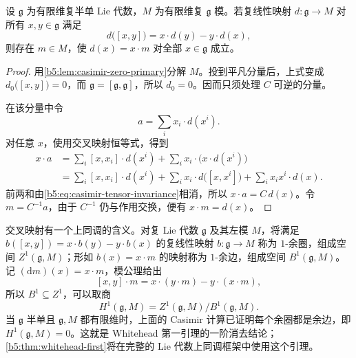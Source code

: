 \begin{lemma}[交叉映射的消去]\label{b5:lem:semisimple-crossed-map}
	设 \(\mathfrak g\) 为有限维复半单 Lie 代数，\(M\) 为有限维复 \(\mathfrak g\) 模。若复线性映射 \(d:\mathfrak g\to M\) 对所有 \(x,y\in\mathfrak g\) 满足
	\[
		d\bigl([x,y]\bigr)=x\cdot d(y)-y\cdot d(x),
	\]
	则存在 \(m\in M\)，使 \(d(x)=x\cdot m\) 对全部 \(x\in\mathfrak g\) 成立。
\end{lemma}
\begin{proof}
	用\cref{b5:lem:casimir-zero-primary}分解 \(M\)。投到平凡分量后，上式变成 \(d_0\bigl([x,y]\bigr)=0\)，而 \(\mathfrak g=[\mathfrak g,\mathfrak g]\)，所以 \(d_0=0\)。因而只须处理 \(C\) 可逆的分量。

	在该分量中令
	\[
		a=\sum_i x_i\cdot d(x^i).
	\]
	对任意 \(x\)，使用交叉映射恒等式，得到
	\begin{align*}
		x\cdot a &=\sum_i[x,x_i]\cdot d(x^i) +\sum_i x_i\cdot\bigl(x\cdot d(x^i)\bigr)\\
		&=\sum_i[x,x_i]\cdot d(x^i) +\sum_i x_i\cdot d\bigl([x,x^i]\bigr) +\sum_i x_i x^i\cdot d(x).
	\end{align*}
	前两和由\eqref{b5:eq:casimir-tensor-invariance}相消，所以 \(x\cdot a=C\,d(x)\)。令 \(m=C^{-1}a\)，由于 \(C^{-1}\) 仍与作用交换，便有 \(x\cdot m=d(x)\)。
\end{proof}

交叉映射有一个上同调的含义。对复 Lie 代数 \(\mathfrak g\) 及其左模 \(M\)，将满足 \(b([x,y])=x\cdot b(y)-y\cdot b(x)\) 的复线性映射 \(b:\mathfrak g\rightarrow M\) 称为 \(1\)-余圈，组成空间 \(Z^1(\mathfrak g,M)\)；形如 \(b(x)=x\cdot m\) 的映射称为 \(1\)-余边，组成空间 \(B^1(\mathfrak g,M)\)。记 \((\mathrm{d}m)(x)=x\cdot m\)，模公理给出
\[
	[x,y]\cdot m=x\cdot(y\cdot m)-y\cdot(x\cdot m),
\]
所以 \(B^1\subseteq Z^1\)，可以取商
\[
	H^1(\mathfrak g,M)=Z^1(\mathfrak g,M)/B^1(\mathfrak g,M).
\]
当 \(\mathfrak g\) 半单且 \(\mathfrak g,M\) 都有限维时，上面的 Casimir 计算已证明每个余圈都是余边，即 \(H^1(\mathfrak g,M)=0\)。这就是 Whitehead 第一引理的一阶消去结论；\cref{b5:thm:whitehead-first}将在完整的 Lie 代数上同调框架中使用这个引理。

